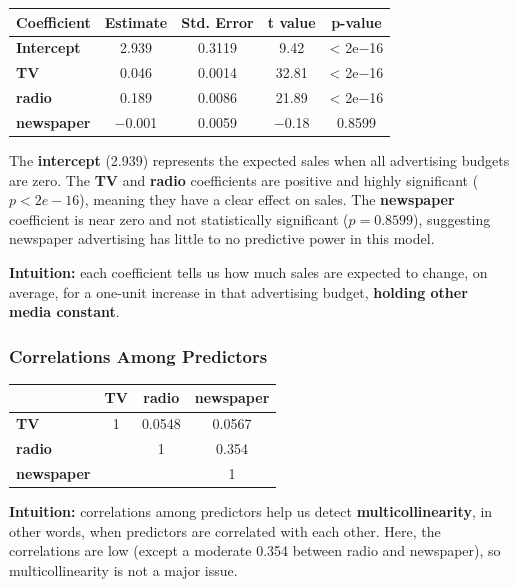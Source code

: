 \documentclass[
  letterpaper,
  DIV=11,
  numbers=noendperiod]{scrartcl}
\begin{document}
\begin{longtable}[]{@{}lcccc@{}}
\toprule\noalign{}
Coefficient & Estimate & Std. Error & t value & p-value \\
\midrule\noalign{}
\endhead
\bottomrule\noalign{}
\endlastfoot
\textbf{Intercept} & 2.939 & 0.3119 & 9.42 & \textless{} 2e−16 \\
\textbf{TV} & 0.046 & 0.0014 & 32.81 & \textless{} 2e−16 \\
\textbf{radio} & 0.189 & 0.0086 & 21.89 & \textless{} 2e−16 \\
\textbf{newspaper} & −0.001 & 0.0059 & −0.18 & 0.8599 \\
\end{longtable}

The \textbf{intercept} (2.939) represents the expected sales when all
advertising budgets are zero. The \textbf{TV} and \textbf{radio}
coefficients are positive and highly significant (\(p < 2e−16\)),
meaning they have a clear effect on sales. The \textbf{newspaper}
coefficient is near zero and not statistically significant
(\(p = 0.8599\)), suggesting newspaper advertising has little to no
predictive power in this model.

\textbf{Intuition:} each coefficient tells us how much sales are
expected to change, on average, for a one-unit increase in that
advertising budget, \textbf{holding other media constant}.

\subsubsection{Correlations Among
Predictors}\label{correlations-among-predictors}

\begin{longtable}[]{@{}lccc@{}}
\toprule\noalign{}
& TV & radio & newspaper \\
\midrule\noalign{}
\endhead
\bottomrule\noalign{}
\endlastfoot
\textbf{TV} & 1 & 0.0548 & 0.0567 \\
\textbf{radio} & & 1 & 0.354 \\
\textbf{newspaper} & & & 1 \\
\end{longtable}

\textbf{Intuition:} correlations among predictors help us detect
\textbf{multicollinearity}, in other words, when predictors are
correlated with each other. Here, the correlations are low (except a
moderate 0.354 between radio and newspaper), so multicollinearity is not
a major issue.
\end{document}
